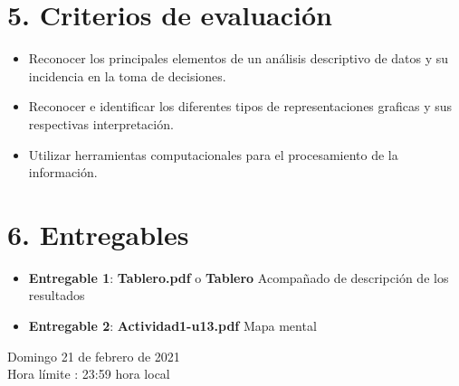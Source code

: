 \documentclass[base=hide,11pt]{elegantbook}
\begin{document}
\section*{5. Criterios de evaluación}


\begin{itemize}
	\item Reconocer los principales elementos de un  análisis descriptivo de datos y su incidencia en la toma de decisiones.
	\item Reconocer e identificar los diferentes tipos de representaciones graficas y sus respectivas interpretación.
	\item Utilizar herramientas computacionales para el procesamiento de la información. 
\end{itemize}

\section*{6. Entregables}

\begin{itemize}
\item {\bf Entregable 1}:\hspace{0.5cm} \textcolor{col3}{\bf Tablero.pdf} o {\bf Tablero} Acompañado de descripción de los resultados 
\item {\bf Entregable 2}: \hspace{0.5cm}\textcolor{col3}{\bf Actividad1-u13.pdf} \hspace{0.5cm} Mapa mental 
\end{itemize}  

\vspace{.3cm}

Domingo 21 de febrero de 2021\\
Hora límite : 23:59  hora  local
%

\end{document}
